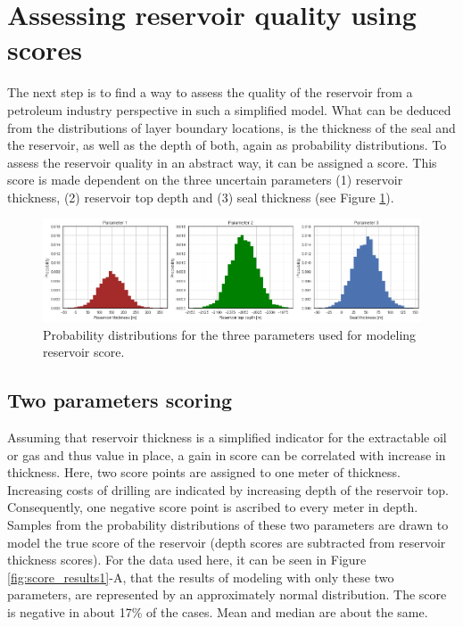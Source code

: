	\section{Assessing reservoir quality using scores}\label{sec:scoring}
	
	The next step is to find a way to assess the quality of the reservoir from a petroleum industry perspective in such a simplified model. What can be deduced from the distributions of layer boundary locations, is the thickness of the seal and the reservoir, as well as the depth of both, again as probability distributions. To assess the reservoir quality in an abstract way, it can be assigned a score. This score is made dependent on the three uncertain parameters (1) reservoir thickness, (2) reservoir top depth and (3) seal thickness (see Figure \ref{fig:3_parameters}).
	
	\begin{figure}[h]
		\centering
		\includegraphics[width=1\textwidth]{Figures/3_parameters.png}
		\caption{Probability distributions for the three parameters used for modeling reservoir score.}\label{fig:3_parameters}
	\end{figure}
	
	\subsection{Two parameters scoring}
	
	Assuming that reservoir thickness is a simplified indicator for the extractable oil or gas and thus value in place, a gain in score can be correlated with increase in thickness. Here, two score points are assigned to one meter of thickness. Increasing costs of drilling are indicated by increasing depth of the reservoir top. Consequently, one negative score point is ascribed to every meter in depth. Samples from the probability distributions of these two parameters are drawn to model the true score of the reservoir (depth scores are subtracted from reservoir thickness scores). For the data used here, it can be seen in Figure \ref{fig:score_results1}-A, that the results of modeling with only these two parameters, are represented by an approximately normal distribution. The score is negative in about 17\% of the cases. Mean and median are about the same.
	
